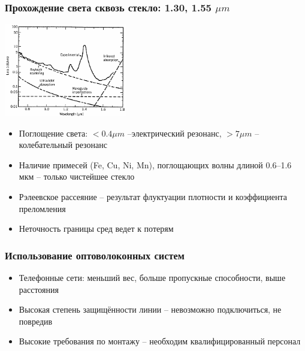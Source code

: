 \documentclass[utf8]{beamer}
\begin{document}
\begin{frame}
\frametitle{Прохождение света сквозь стекло: 1.30, 1.55 $\mu m$}
\begin{center}
\includegraphics[width=0.4\textwidth]{pics/fiber-loss.png}
\end{center}
\begin{itemize}
 \item Поглощение света: $<0.4\mu m$ --электрический резонанс, $>7\mu m$ -- колебательный резонанс
 \item Наличие примесей (Fe, Cu, Ni, Mn), поглощающих волны длиной 0.6--1.6 мкм -- только чистейшее стекло
 \item Рэлеевское рассеяние -- результат флуктуации плотности и коэффициента преломления
 \item Неточность границы сред ведет к потерям
\end{itemize}
\end{frame}
\begin{frame}
\frametitle{Использование оптоволоконных систем}
\begin{itemize}
 \item Телефонные сети: меньший вес, больше пропускные способности, выше расстояния
 \item Высокая степень защищённости линии -- невозможно подключиться, не повредив
 \item Высокие требования по монтажу -- необходим квалифицированный персонал
\end{itemize}
\end{frame}
\end{document}
